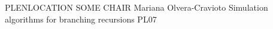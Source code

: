 	{PLENLOCATION}	%
	{SOME CHAIR}		%
	{Mariana Olvera-Cravioto}	%
	{Simulation algorithms for branching recursions}		%
	{PL07}			%
	\\\hline
